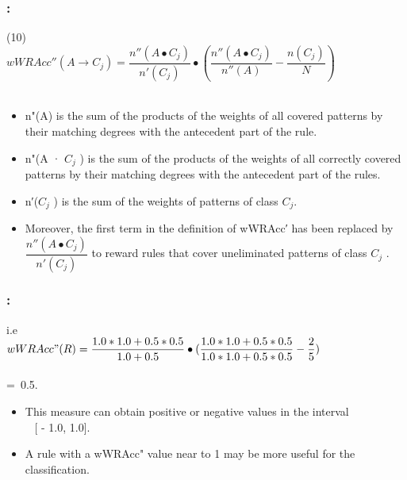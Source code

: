 \documentclass{beamer}
\begin{document}
\begin{CJK*}{UTF8}{bsmi}

\begin{frame}
	\frametitle{\insertsection : \insertsubsection}
	
	\begin{block}{ (10)}
		~\\
		\centering\textbf{$wWRAcc''  (A\longrightarrow C_{j})=\dfrac{n''(A\bullet C_{j})}{n'(C_{j})}\bullet(\dfrac{n''(A\bullet C_{j})}{n''(A)}-\dfrac{n(C_{j})}{N})$}\\
		~\\
	\end{block}
{\small 		\begin{itemize}
			\item n"(A) is the sum of the products of the weights of all covered patterns by their matching degrees with the antecedent part of the rule.
			\item n"(A · $C_{j}$ ) is the sum of the products of the weights of all correctly covered patterns by their matching degrees with the antecedent part of the rules.
			\item n′($C_{j}$ ) is the sum of the weights of patterns of class $C_{j}$.
			\item Moreover, the first term
			in the definition of wWRAcc′ has been replaced by $\dfrac{n''(A\bullet C_{j})}{n'(C_{j})}$ to reward rules that cover uneliminated patterns of class $C_{j}$ .
		\end{itemize}}
	
\end{frame}



\begin{frame}
	\frametitle{\insertsection : \insertsubsection}

	\begin{block}{i.e }
	~\\
		\centering\textbf{$wWRAcc"  (R)=\dfrac{1.0\ast1.0+0.5\ast0.5}{1.0+0.5}\bullet(\dfrac{1.0\ast1.0+0.5\ast0.5}{1.0\ast1.0+0.5\ast0.5}-\dfrac{2}{5})$}\\
		~\\
		=~0.5.~~~~~~~~~~~~~~~~~~~~~~~~~~~~~
		~\\
	\end{block}
			\begin{itemize}
				\item This measure can obtain positive or negative values in the interval \\~ [ - 1.0, 1.0]. 
				\item A rule with a wWRAcc" value near to 1 may be more useful for the classification.
			\end{itemize}
	

\end{frame}
\end{CJK*}
\end{document}
